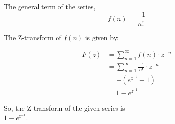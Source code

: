 \documentclass[journal,12pt,twocolumn]{IEEEtran}
\begin{document}
The general term of the series, 
\[ f(n) = \frac{-1}{n!} \]

The Z-transform of \( f(n) \) is given by:

\begin{align*}
    F(z) & = \sum_{n=1}^{\infty} f(n) \cdot z^{-n} \\
    & = \sum_{n=1}^{\infty} \frac{-1}{n!} \cdot z^{-n} \\
    & = - (e^{z^{-1}} - 1) \\
    & = 1 - e^{z^{-1}}  
\end{align*}

So, the Z-transform of the given series is \\
\( 1 - e^{z^{-1}} \).
\end{document}
